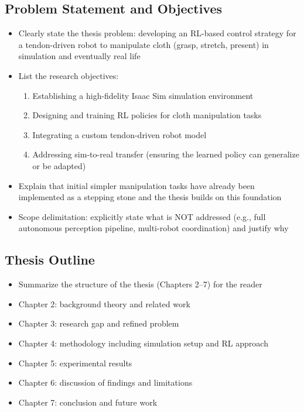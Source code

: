 \subsection{Problem Statement and Objectives}
\begin{itemize}
    \item Clearly state the thesis problem: developing an RL-based control strategy for a tendon-driven robot to manipulate cloth (grasp, stretch, present) in simulation and eventually real life
    \item List the research objectives:
    \begin{enumerate}
        \item Establishing a high-fidelity Isaac Sim simulation environment
        \item Designing and training RL policies for cloth manipulation tasks
        \item Integrating a custom tendon-driven robot model
        \item Addressing sim-to-real transfer (ensuring the learned policy can generalize or be adapted)
    \end{enumerate}
    \item Explain that initial simpler manipulation tasks have already been implemented as a stepping stone and the thesis builds on this foundation
    \item Scope delimitation: explicitly state what is NOT addressed (e.g., full autonomous perception pipeline, multi-robot coordination) and justify why
\end{itemize}

\subsection{Thesis Outline}
\begin{itemize}
    \item Summarize the structure of the thesis (Chapters 2--7) for the reader
    \item Chapter 2: background theory and related work
    \item Chapter 3: research gap and refined problem
    \item Chapter 4: methodology including simulation setup and RL approach
    \item Chapter 5: experimental results
    \item Chapter 6: discussion of findings and limitations
    \item Chapter 7: conclusion and future work
\end{itemize}

